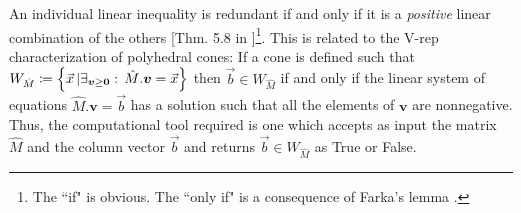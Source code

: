 An individual linear inequality is redundant if and only if it is a \emph{positive} linear combination of the others [Thm. 5.8 in \citealp{fordan1999projection}]\footnote{The ``if" is obvious. The ``only if" is a consequence of Farka's lemma \cite{fordan1999projection}.}. This is related to the V-rep characterization of polyhedral cones: If a cone is defined such that $W_{\hat{M}}\coloneqq\left\lbrace\vec{x}\,|\exists_{\bm{v}\geq\bm{0}}:\, \hat{M}.\bm{v}=\vec{x}\right\rbrace$ then $\vec{b}\in W_{\hat{M}}$ if and only if the linear system of equations $\hat{M}.\bm{v}=\vec{b}$ has a solution such that all the elements of $\bm{v}$ are nonnegative.  Thus, the computational tool required is one which accepts as input the matrix $\hat{M}$ and the column vector $\vec{b}$ and returns $\vec{b}\in W_{\hat{M}}$ as True or False. 





